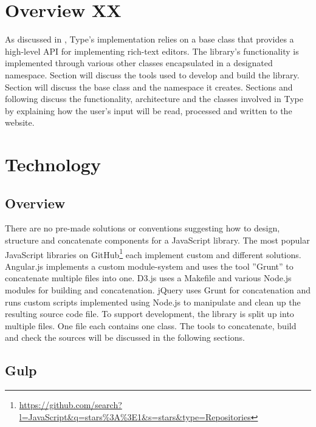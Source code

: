 

\section{Overview XX}

As discussed in , Type's implementation relies on a base class that provides a high-level API for implementing rich-text editors. The library's functionality is implemented through various other classes encapsulated in a designated namespace. Section  will discuss the tools used to develop and build the library. Section  will discuss the base class and the namespace it creates. Sections  and following discuss the functionality, architecture and the classes involved in Type by explaining how the user's input will be read, processed and written to the website.

\section{Technology}
\label{sec:impl_technology}

\subsection{Overview}

There are no pre-made solutions or conventions suggesting how to design, structure and concatenate components for a JavaScript library. The most popular JavaScript libraries on GitHub\footnote{\url{https://github.com/search?l=JavaScript\&q=stars\%3A\%3E1\&s=stars\&type=Repositories}} each implement custom and different solutions. Angular.js implements a custom module-system and uses the tool ''Grunt'' to concatenate multiple files into one. D3.js uses a Makefile and various Node.js modules for building and concatenation. jQuery uses Grunt for concatenation and runs custom scripts implemented using Node.js to manipulate and clean up the resulting source code file. To support development, the library is split up into multiple files. One file each contains one class. The tools to concatenate, build and check the sources will be discussed in the following sections.

\subsection{Gulp}

